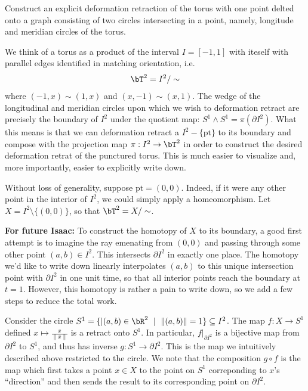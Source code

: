 \begin{homework}[e]

	\prob Construct an explicit deformation retraction of the torus with one point delted onto a graph consisting of two circles intersecting in a point, namely, longitude and meridian circles of the torus.
	\begin{prf}
		We think of a torus as a product of the interval $I = [-1,1]$ with iteself with parallel edges identified in matching orientation, i.e.
		\begin{align*}
			\bT^2 = I^2/\sim
		\end{align*}
		where $(-1,x) \sim (1,x)$ and $(x,-1) \sim (x,1)$. The wedge of the longitudinal and meridian circles upon which we wish to deformation retract are precisely the boundary of $I^2$ under the quotient map: $S^1\wedge S^1 = \pi(\partial I^2)$. What this means is that we can deformation retract a $I^2 - \{\text{pt}\}$ to its boundary and compose with the projection map $\pi:I^2 \to \bT^2$ in order to construct the desired deformation retrat of the punctured torus. This is much easier to visualize and, more importantly, easier to explicitly write down.

		Without loss of generality, suppose $\text{pt} = (0,0)$. Indeed, if it were any other point in the interior of $I^2$, we could simply apply a homeomorphism. Let $X = I^2 \setminus \{(0,0)\}$, so that $\bT^2 = X/\sim$.
		
		\textbf{For future Isaac:} To construct the homotopy of $X$ to its boundary, a good first attempt is to imagine the ray emenating from $(0,0)$ and passing through some other point $(a,b) \in I^2$. This intersects $\partial I^2$ in exactly one place. The homotopy we'd like to write down linearly interpolates $(a,b)$ to this unique intersection point with $\partial I^2$ in one unit time, so that all interior points reach the boundary at $t = 1$. However, this homotopy is rather a pain to write down, so we add a few steps to reduce the total work.

		Consider the circle $S^1 = \{|(a,b) \in \bR^2 ~\mid~ \|(a,b)\| = 1\} \subseteq I^2$. The map $f:X \to S^1$ defined $x \mapsto \frac{x}{\|x\|}$ is a retract onto $S^1$. In particular, $f|_{\partial I^2}$ is a bijective map from $\partial I^2$ to $S^1$, and thus has inverse $g:S^1 \to \partial I^2$. This is the map we intuitively described above restricted to the circle. We note that the composition $g\circ f$ is the map which first takes a point $x \in X$ to the point on $S^1$ correponding to $x$'s ``direction'' and then sends the result to its corresponding point on $\partial I^2$.


\end{prf}
\end{homework}
